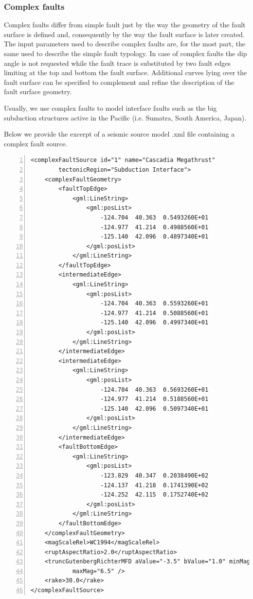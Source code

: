 \subsubsection{Complex faults}
%
Complex faults differ from simple fault just by the way the geometry of 
the fault surface is defined and, consequently by the way the fault 
surface is later created. 
The input parameters used to describe complex faults are, for the most 
part, the same used to describe the simple fault typology. 
In case of complex faults the dip angle is not requested while the fault
trace is substituted by two fault edges limiting at the top and bottom 
the fault surface. Additional curves lying over the fault surface can be 
specified to complement and refine the description of the fault surface 
geometry.

Usually, we use complex faults to model interface faults such 
as the big subduction structures active in the Pacific (i.e. 
Sumatra, South America, Japan).

Below we provide the excerpt of a seismic source model .xml file 
containing a complex fault source.
\begin{Verbatim}[frame=single, commandchars=\\\{\}, fontsize=\footnotesize,
    numbers=left, numbersep=2pt]
<complexFaultSource id="1" name="Cascadia Megathrust" 
		tectonicRegion="Subduction Interface">
    <complexFaultGeometry>
        <faultTopEdge>
            <gml:LineString>
                <gml:posList>
                    -124.704  40.363  0.5493260E+01
                    -124.977  41.214  0.4988560E+01
                    -125.140  42.096  0.4897340E+01
                </gml:posList>
            </gml:LineString>
        </faultTopEdge>
        <intermediateEdge>
            <gml:LineString>
                <gml:posList>
                    -124.704  40.363  0.5593260E+01
                    -124.977  41.214  0.5088560E+01
                    -125.140  42.096  0.4997340E+01
                </gml:posList>
            </gml:LineString>
        </intermediateEdge>
        <intermediateEdge>
            <gml:LineString>
                <gml:posList>
                    -124.704  40.363  0.5693260E+01
                    -124.977  41.214  0.5188560E+01
                    -125.140  42.096  0.5097340E+01
                </gml:posList>
            </gml:LineString>
        </intermediateEdge>
        <faultBottomEdge>
            <gml:LineString>
                <gml:posList>
                    -123.829  40.347  0.2038490E+02
                    -124.137  41.218  0.1741390E+02
                    -124.252  42.115  0.1752740E+02
                </gml:posList>
            </gml:LineString>
        </faultBottomEdge>
    </complexFaultGeometry>
    <magScaleRel>WC1994</magScaleRel>
    <ruptAspectRatio>2.0</ruptAspectRatio>
    <truncGutenbergRichterMFD aValue="-3.5" bValue="1.0" minMag="5.0" 
			maxMag="6.5" />
    <rake>30.0</rake>
</complexFaultSource>
\end{Verbatim}
%
